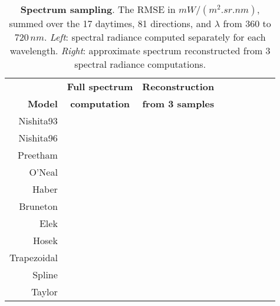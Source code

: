 \begin{table}[h!]
\renewcommand{\arraystretch}{1.3}
\caption{{\bf Spectrum sampling}. The RMSE in $mW/(m^2.sr.nm)$, summed over the
17 daytimes, 81 directions, and $\lambda$ from $360$ to $720\,nm$. {\em Left}:
spectral radiance computed separately for each wavelength. {\em Right}:
approximate spectrum reconstructed from 3 spectral radiance computations.}
\label{fig:approx_spectral}
\centering
\begin{tabular}{|r||c|c|c|c|c|c|c|c|}
\hline
\bfseries & \bfseries Full spectrum & \bfseries Reconstruction \\
\bfseries Model & \bfseries computation & \bfseries from 3 samples \\
\hline
Nishita93 &  &
 \\
\hline
Nishita96 &  &
 \\
\hline
Preetham &  &
 \\
\hline
O'Neal &  &
 \\
\hline
Haber &  &
 \\
\hline
Bruneton &  &
 \\
\hline
Elek &  &
 \\
\hline
Hosek &  &
 \\
\hline
Trapezoidal &  &
 \\
\hline
Spline &  &
 \\
\hline
Taylor &  &
 \\
\hline
\end{tabular}
\end{table}

